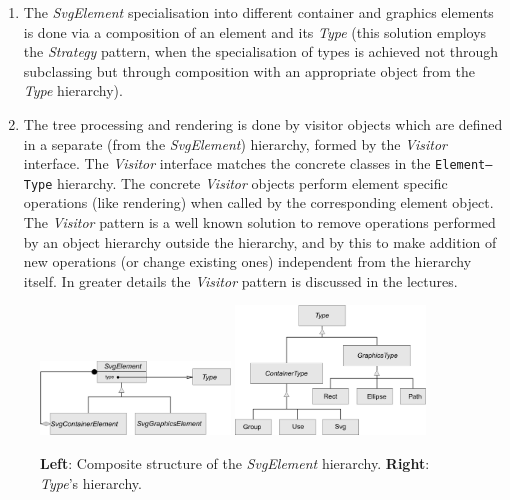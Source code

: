 \documentclass[a4paper]{article}
\begin{document}
\begin{enumerate}
        and it is shown on the Figure~\ref{fig:composite}.
        \item The \emph{SvgElement} specialisation into different container and graphics elements
        is done via a composition of an element and its \emph{Type} (this solution
        employs the \emph{Strategy} pattern, when the specialisation of types is achieved not 
        through subclassing but through composition with an appropriate object
        from the \emph{Type} hierarchy).
        \item The tree processing and rendering is done by visitor objects
        which are defined in a separate (from the \emph{SvgElement}) hierarchy, formed
        by the \emph{Visitor} interface. The \emph{Visitor} interface matches the concrete
        classes in the \texttt{Element--Type} hierarchy. The concrete \emph{Visitor} objects
        perform element specific operations (like rendering) when called by the corresponding
        element object. The \emph{Visitor} pattern is a well known solution to remove operations
        performed by an object hierarchy outside the hierarchy, and by this to make addition of
        new operations (or change existing ones) independent from the hierarchy itself.
        In greater details the \emph{Visitor} pattern is discussed in the lectures.
\end{enumerate}

\begin{center}
\begin{figure}[ht]
\includegraphics[width=0.45\textwidth]{forge-composite.pdf}\hspace{0.1\textwidth}
\includegraphics[width=0.45\textwidth]{forge-composite-type.pdf}
\caption{\textbf{Left}: Composite structure of the \emph{SvgElement} hierarchy.
\quad\textbf{Right}: \emph{Type}'s hierarchy.}
\label{fig:composite}
\end{figure}
\end{center}
\end{document}
